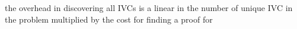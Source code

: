 
\newcommand{\takeaway}[1]{
\vspace{6pt}
\noindent\fbox{\parbox{0.975\columnwidth}{#1}}
\vspace{6pt}
}
 the overhead
in discovering all IVCs is a linear in the number of unique IVC
in the problem multiplied by the cost for finding a proof for

%
%
